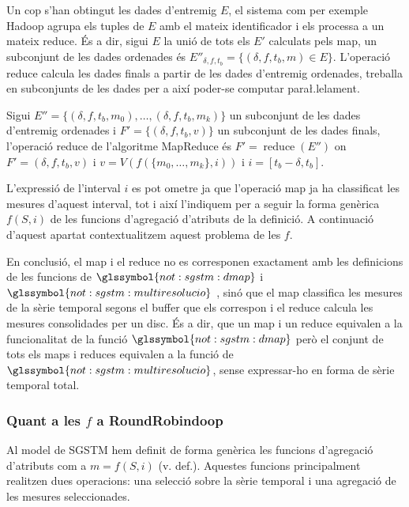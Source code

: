 Un cop s'han obtingut les dades d'entremig $E$, el sistema com per
exemple Hadoop agrupa els tuples de $E$ amb el mateix identificador i
els processa a un mateix reduce. És a dir, sigui $E$ la unió de tots
els $E'$ calculats pels map, un subconjunt de les dades ordenades és
$E''_{\delta,f,t_b} = \{ (\delta,f,t_b,m) \in E \}$.  L'operació
reduce calcula les dades finals a partir de les dades d'entremig
ordenades, treballa en subconjunts de les dades per a així poder-se
computar para\l.lelament.
\begin{definition}
  Sigui $E''= \{ (\delta,f,t_b,m_0) ,\dotsc, (\delta,f,t_b,m_k) \}$ un
  subconjunt de les dades d'entremig ordenades i $F'=\{
  (\delta,f,t_b,v) \}$ un subconjunt de les dades finals, l'operació
  reduce de l'algoritme MapReduce és $F'=\operatorname{reduce}(E'')$
  on $F'= (\delta,f,t_b,v)$ i $v= V( f(\{m_0,\dotsc,m_k\},i))$ i
  $i=[t_b-\delta,t_b]$.
\end{definition}

L'expressió de l'interval $i$ es pot ometre ja que l'operació map ja
ha classificat les mesures d'aquest interval, tot i així l'indiquem
per a seguir la forma genèrica $f(S,i)$ de les funcions d'agregació
d'atributs de la definició. A continuació d'aquest apartat
contextualitzem aquest problema de les $f$.


En conclusió, el map i el reduce no es corresponen exactament
amb les definicions de les funcions de $\glssymbol{not:sgstm:dmap}$ i
$\glssymbol{not:sgstm:multiresolucio}$ , sinó
que el map classifica les mesures de la sèrie temporal segons el
buffer que els correspon i el reduce calcula les mesures consolidades
per un disc. És a dir, que un map i un reduce equivalen a la
funcionalitat de la funció $\glssymbol{not:sgstm:dmap}$ però el
conjunt de tots els maps i reduces equivalen a la funció de
$\glssymbol{not:sgstm:multiresolucio}$, sense expressar-ho en forma de
sèrie temporal total.



\subsubsection{Quant a les $f$ a RoundRobindoop}
\label{sec:mapreduce:f}

Al model de \gls{SGSTM} hem definit de forma genèrica les funcions
d'agregació d'atributs com a $m=f(S,i)$ (v. def.). Aquestes funcions
principalment realitzen dues operacions: una selecció sobre la sèrie
temporal i una agregació de les mesures seleccionades. 


